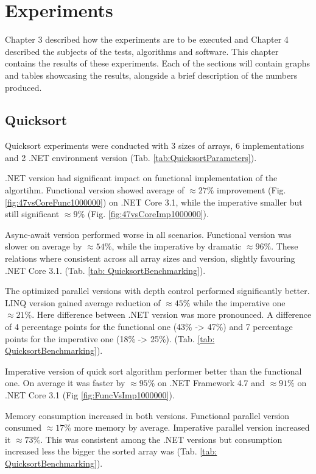 \clearpage
\chapter{Experiments}
Chapter 3 described how the experiments are to be executed and Chapter 4 described the subjects of the tests, algorithms and software. This chapter contains the results of these experiments. Each of the sections will contain graphs and tables showcasing the results, alongside a brief description of the numbers produced. 

\section{Quicksort}
Quicksort experiments were conducted with 3 sizes of arrays, 6 implementations and 2 .NET environment version (Tab. \ref{tab:QuicksortParameters}). 

.NET version had significant impact on functional implementation of the algortihm. Functional version showed average of $\approx 27\%$ improvement (Fig. \ref{fig:47vsCoreFunc1000000}) on .NET Core 3.1, while the imperative smaller but still significant  $\approx 9\%$ (Fig. \ref{fig:47vsCoreImp1000000}).

Async-await version performed worse in all scenarios. Functional version was slower on average by $\approx 54\%$, while the imperative by dramatic $\approx 96\%$. These relations where consistent across all array sizes and version, slightly favouring .NET Core 3.1. (Tab. \ref{tab: QuicksortBenchmarking}).

The optimized parallel versions with depth control performed significantly better. LINQ version gained average reduction  of $\approx 45\%$ while the imperative one 
$\approx 21\%$. Here difference between .NET version was more pronounced. A difference of 4 percentage points for the functional one (43\% -> 47\%) and 7 percentage points for the imperative one (18\% -> 25\%). (Tab. \ref{tab: QuicksortBenchmarking}).

Imperative version of quick sort algorithm performer better than the functional one. On average it was faster by $\approx 95\%$ on .NET Framework 4.7 and $\approx 91\%$ on .NET Core 3.1 (Fig \ref{fig:FuncVsImp1000000}).

Memory consumption increased in both versions. Functional parallel version consumed $\approx 17\%$ more memory by average. Imperative parallel version increased it $\approx 73\%$. This was consistent among the .NET versions but consumption increased less the bigger the sorted array was (Tab. \ref{tab: QuicksortBenchmarking}).


